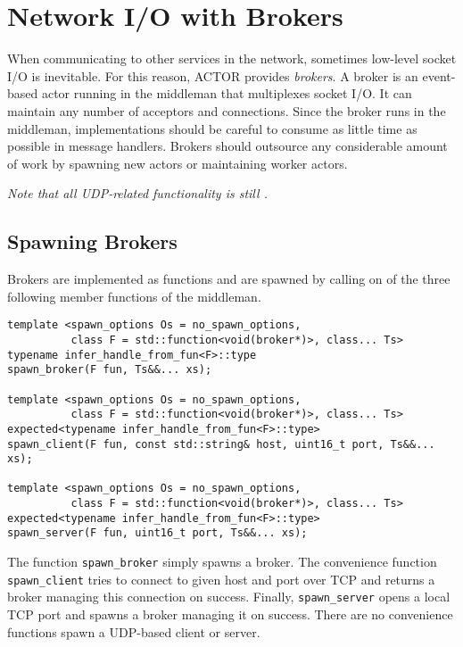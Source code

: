 \section{Network I/O with Brokers}
\label{broker}

When communicating to other services in the network, sometimes low-level socket
I/O is inevitable. For this reason, ACTOR provides \emph{brokers}. A broker is
an event-based actor running in the middleman that multiplexes socket I/O. It
can maintain any number of acceptors and connections. Since the broker runs in
the middleman, implementations should be careful to consume as little time as
possible in message handlers. Brokers should outsource any considerable amount
of work by spawning new actors or maintaining worker actors.

\textit{Note that all UDP-related functionality is still \experimental.}

\subsection{Spawning Brokers}

Brokers are implemented as functions and are spawned by calling on of the three
following member functions of the middleman.

\begin{lstlisting}
template <spawn_options Os = no_spawn_options,
          class F = std::function<void(broker*)>, class... Ts>
typename infer_handle_from_fun<F>::type
spawn_broker(F fun, Ts&&... xs);

template <spawn_options Os = no_spawn_options,
          class F = std::function<void(broker*)>, class... Ts>
expected<typename infer_handle_from_fun<F>::type>
spawn_client(F fun, const std::string& host, uint16_t port, Ts&&... xs);

template <spawn_options Os = no_spawn_options,
          class F = std::function<void(broker*)>, class... Ts>
expected<typename infer_handle_from_fun<F>::type>
spawn_server(F fun, uint16_t port, Ts&&... xs);
\end{lstlisting}

The function \lstinline^spawn_broker^ simply spawns a broker. The convenience
function \lstinline^spawn_client^ tries to connect to given host and port over
TCP and returns a broker managing this connection on success. Finally,
\lstinline^spawn_server^ opens a local TCP port and spawns a broker managing it
on success. There are no convenience functions spawn a UDP-based client or
server.

